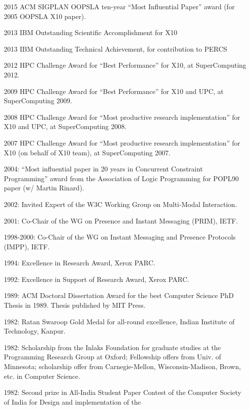 \documentclass{article}
\begin{document}
\begin{description}
\item{2015} ACM SIGPLAN OOPSLA ten-year ``Most Influential Paper'' award (for
  2005 OOPSLA X10 paper).
\item{2013} IBM Outstanding Scientific Accomplishment for X10
\item{2013} IBM Outstanding Technical Achievement, for contribution to PERCS
\item{2012} HPC Challenge Award for ``Best Performance''
for X10, at SuperComputing 2012.
\item{2009} HPC Challenge Award for ``Best Performance''
for X10 and UPC, at SuperComputing 2009.
\item{2008} HPC Challenge Award for ``Most productive research
implementation'' for X10 and UPC, at SuperComputing
2008.
\item{2007} HPC Challenge Award for ``Most productive research
implementation'' for X10 (on behalf of X10 team), at SuperComputing
2007.
\item{2004:} ``Most influential paper in 20 years in Concurrent
Constraint Programming'' award from the Association of Logic
Programming for POPL90 paper (w/ Martin Rinard).
\item{2002:} Invited Expert of the W3C Working Group on Multi-Modal
Interaction.
\item{2001:} Co-Chair of the WG on Presence and Instant Messaging
(PRIM), IETF.
\item{1998-2000:} Co-Chair of the WG on Instant Messaging and
 Presence Protocols (IMPP), IETF.
\item{1994:} Excellence in Research Award, Xerox PARC.   
\item{1992:} Excellence in Support of Research Award, Xerox PARC.   
\item{1989:} ACM Doctoral Dissertation Award for the best Computer Science
   PhD Thesis in 1989. Thesis published by MIT Press.
\item{1982:} Ratan Swaroop Gold Medal for all-round excellence,
      Indian Institute of Technology, Kanpur. 
\item{1982:} Scholarship from the Inlaks Foundation for graduate studies
      at the Programming Research Group at Oxford; Fellowship
      offers from Univ. of  Minnesota; scholarship offer from 
      Carnegie-Mellon, Wisconsin-Madison, Brown, etc.  in
      Computer Science.  
\item{1982:} Second prize in All-India Student Paper Contest of the
      Computer Society of India for  Design and implementation of the

\end{description}
\end{document}
